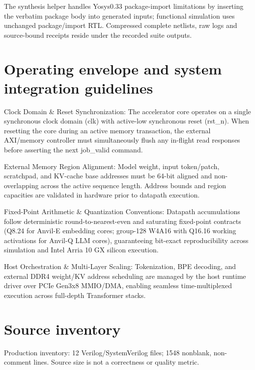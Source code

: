 \documentclass[11pt,a4paper]{article}
\begin{document}
The synthesis helper handles Yosys0.33 package-import limitations by inserting the verbatim package body into generated inputs; functional simulation uses unchanged package/\allowbreak{}import RTL. Compressed complete netlists,\allowbreak{} raw logs and source-bound receipts reside under the recorded suite outputs.


\section{Operating envelope and system integration guidelines}

Clock Domain \& Reset Synchronization: The accelerator core operates on a single synchronous clock domain (\allowbreak{}clk)\allowbreak{} with active-low synchronous reset (\allowbreak{}rst\_\allowbreak{}n)\allowbreak{}. When resetting the core during an active memory transaction,\allowbreak{} the external AXI/\allowbreak{}memory controller must simultaneously flush any in-flight read responses before asserting the next job\_\allowbreak{}valid command.


External Memory Region Alignment: Model weight,\allowbreak{} input token/\allowbreak{}patch,\allowbreak{} scratchpad,\allowbreak{} and KV-cache base addresses must be 64-bit aligned and non-overlapping across the active sequence length. Address bounds and region capacities are validated in hardware prior to datapath execution.


Fixed-Point Arithmetic \& Quantization Conventions: Datapath accumulations follow deterministic round-to-nearest-even and saturating fixed-point contracts (\allowbreak{}Q8.24 for Anvil-E embedding cores; group-128 W4A16 with Q16.16 working activations for Anvil-Q LLM cores)\allowbreak{},\allowbreak{} guaranteeing bit-exact reproducibility across simulation and Intel Arria 10 GX silicon execution.


Host Orchestration \& Multi-Layer Scaling: Tokenization,\allowbreak{} BPE decoding,\allowbreak{} and external DDR4 weight/\allowbreak{}KV address scheduling are managed by the host runtime driver over PCIe Gen3x8 MMIO/\allowbreak{}DMA,\allowbreak{} enabling seamless time-multiplexed execution across full-depth Transformer stacks.


\appendix{}\section{Source inventory}

Production inventory: 12 Verilog/\allowbreak{}SystemVerilog files; 1548 nonblank,\allowbreak{} non-comment lines. Source size is not a correctness or quality metric.
\end{document}
